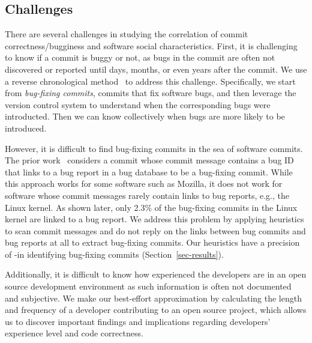 \subsection{Challenges}
There are several challenges in studying the correlation of commit correctness/bugginess and software social characteristics.
First, it is challenging to know if a commit is buggy or not,
as bugs in the commit are often not 
discovered or reported until days, months, or even years after the commit. 
We use a reverse chronological method~\cite{sliwerski-msr-2005} to address this challenge. 
Specifically, we start from {\em bug-fixing commits}, commits that fix software bugs, 
and then leverage the version control system to understand when the corresponding bugs were introducted. 
Then we can know collectively when bugs are more likely to be introduced. 

However, it is difficult to find bug-fixing commits in the sea of software commits.
The prior work~\cite{sliwerski-msr-2005} considers a commit whose commit message contains a bug 
ID that links to a bug report in a bug database to be a bug-fixing commit. While this
approach works for some software such as Mozilla, it does not work for software whose commit messages
rarely contain links to bug reports, e.g., the Linux kernel.
As shown later, only 2.3\% of the bug-fixing commits in the Linux kernel are linked to a bug report.
We address this problem by applying heuristics 
to scan commit messages and do not reply on the links between bug commits and bug reports at all to extract bug-fixing commits.
Our heuristics have a precision of \postP-\linuxP in identifying bug-fixing commits (Section~\ref{sec-results}).

Additionally, it is difficult to know how experienced the developers are in an open source development
environment as such information is often not documented and subjective. 
We make our best-effort approximation by calculating the length and frequency of a developer
contributing to an open source project, which allows us to discover important findings 
and implications regarding developers' experience level and code correctness. 

